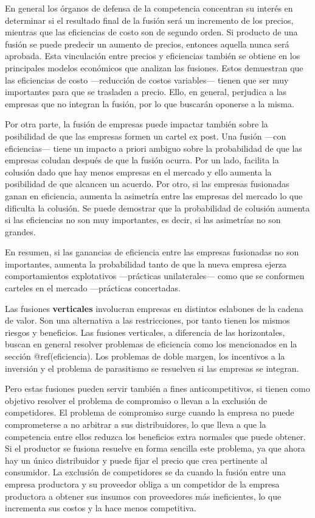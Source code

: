 \documentclass[
  12pt,
  spanish,
]{book}
\begin{document}
En general los órganos de defensa de la competencia concentran su
interés en determinar si el resultado final de la fusión será un
incremento de los precios, mientras que las eficiencias de costo son de
segundo orden. Si producto de una fusión se puede predecir un aumento de
precios, entonces aquella nunca será aprobada. Esta vinculación entre
precios y eficiencias también se obtiene en los principales modelos
económicos que analizan las fusiones. Estos demuestran que las
eficiencias de costo ---reducción de costos variables--- tienen que ser
muy importantes para que se trasladen a precio. Ello, en general,
perjudica a las empresas que no integran la fusión, por lo que buscarán
oponerse a la misma.

Por otra parte, la fusión de empresas puede impactar también sobre la
posibilidad de que las empresas formen un cartel ex post. Una fusión
---con eficiencias--- tiene un impacto a priori ambiguo sobre la
probabilidad de que las empresas coludan después de que la fusión
ocurra. Por un lado, facilita la colusión dado que hay menos empresas en
el mercado y ello aumenta la posibilidad de que alcancen un acuerdo. Por
otro, si las empresas fusionadas ganan en eficiencia, aumenta la
asimetría entre las empresas del mercado lo que dificulta la colusión.
Se puede demostrar que la probabilidad de colusión aumenta si las
eficiencias no son muy importantes, es decir, si las asimetrías no son
grandes.

En resumen, si las ganancias de eficiencia entre las empresas fusionadas
no son importantes, aumenta la probabilidad tanto de que la nueva
empresa ejerza comportamientos explotativos ---prácticas unilaterales---
como que se conformen carteles en el mercado ---prácticas concertadas.

Las fusiones \textbf{verticales} involucran empresas en distintos
eslabones de la cadena de valor. Son una alternativa a las
restricciones, por tanto tienen los mismos riesgos y beneficios. Las
fusiones verticales, a diferencia de las horizontales, buscan en general
resolver problemas de eficiencia como los mencionados en la sección
@ref(eficiencia). Los problemas de doble margen, los incentivos a la
inversión y el problema de parasitismo se resuelven si las empresas se
integran.

Pero estas fusiones pueden servir también a fines anticompetitivos, si
tienen como objetivo resolver el problema de compromiso o llevan a la
exclusión de competidores. El problema de compromiso surge cuando la
empresa no puede comprometerse a no arbitrar a sus distribuidores, lo
que lleva a que la competencia entre ellos reduzca los beneficios extra
normales que puede obtener. Si el productor se fusiona resuelve en forma
sencilla este problema, ya que ahora hay un único distribuidor y puede
fijar el precio que crea pertinente al consumidor. La exclusión de
competidores se da cuando la fusión entre una empresa productora y su
proveedor obliga a un competidor de la empresa productora a obtener sus
insumos con proveedores más ineficientes, lo que incrementa sus costos y
la hace menos competitiva.
\end{document}
